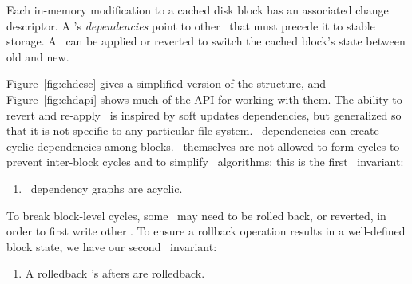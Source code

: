 \newcommand{\chdescinvar}[2]{\begin{enumerate}\setcounter{enumi}{\value{chdescinvari}}\item #2\label{invar:#1}\setcounter{chdescinvari}{\value{enumi}}\end{enumerate}}



Each in-memory modification to a cached disk block has an associated
change descriptor.
%
A \chdesc's \emph{dependencies} point to other \chdescs\ that must
precede it to stable storage. A \chdesc\ can be applied or reverted to switch
the cached block's state between old and new.

Figure~\ref{fig:chdesc} gives a simplified version of the structure, and
Figure~\ref{fig:chdapi} shows much of the API for working with them.
%
The ability
to revert and re-apply \chdescs\ is inspired by soft updates dependencies, but
generalized so that it is not specific to any particular file system.
%
\Chdesc\ dependencies can create cyclic dependencies among
blocks. \Chdescs\ themselves are not allowed to form cycles
to prevent inter-block cycles and to simplify \chdesc\ algorithms;
this is the first \chdesc\ invariant:
\chdescinvar{acyclic}{\Chdesc\ dependency graphs are acyclic.}
%
To break block-level cycles, some \chdescs\ may need to be rolled
back, or reverted, in order to first write other \chdescs. To ensure a
rollback operation results in a well-defined block state, we have our
second \chdesc\ invariant: \chdescinvar{rollback}{A rolledback \chdesc{}'s
afters are rolledback.}

